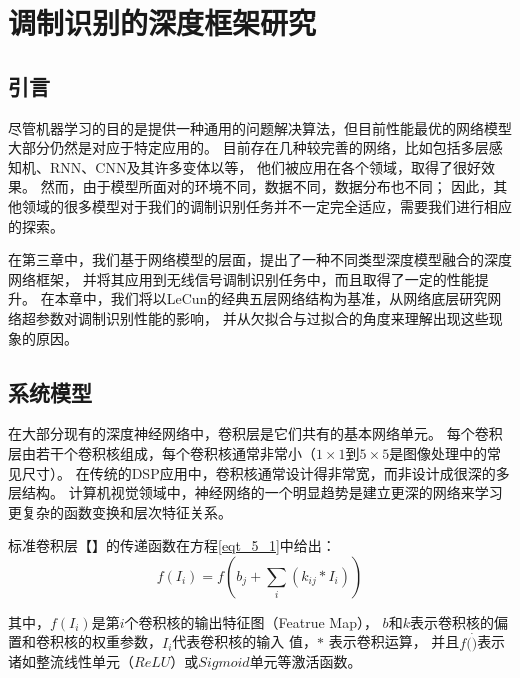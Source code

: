 \chapter{调制识别的深度框架研究}

\section{引言}

尽管机器学习的目的是提供一种通用的问题解决算法，但目前性能最优的网络模型大部分仍然是对应于特定应用的。
目前存在几种较完善的网络，比如包括多层感知机、RNN、CNN及其许多变体以等，
他们被应用在各个领域，取得了很好效果。
然而，由于模型所面对的环境不同，数据不同，数据分布也不同；
因此，其他领域的很多模型对于我们的调制识别任务并不一定完全适应，需要我们进行相应的探索。 \par

在第三章中，我们基于网络模型的层面，提出了一种不同类型深度模型融合的深度网络框架，
并将其应用到无线信号调制识别任务中，而且取得了一定的性能提升。
在本章中，我们将以LeCun的经典五层网络结构为基准，从网络底层研究网络超参数对调制识别性能的影响，
并从欠拟合与过拟合的角度来理解出现这些现象的原因。\par

\section{系统模型}

在大部分现有的深度神经网络中，卷积层是它们共有的基本网络单元。
每个卷积层由若干个卷积核组成，每个卷积核通常非常小（$1 \times 1$到$5 \times 5$是图像处理中的常见尺寸）。
在传统的DSP应用中，卷积核通常设计得非常宽，而非设计成很深的多层结构。
计算机视觉领域中，神经网络的一个明显趋势是建立更深的网络来学习更复杂的函数变换和层次特征关系。\par

标准卷积层【】的传递函数在方程\ref{eqt_5_1}中给出：
\begin{equation}
	\label{eqt_5_1}
	f(I_i) = f (b_j + \sum_{i}(k_{ij} * I_i))
\end{equation}

其中，$f(I_i)$是第$i$个卷积核的输出特征图（Featrue Map），
$b$和$k$表示卷积核的偏置和卷积核的权重参数，$I_i$代表卷积核的输入 值，$*$ 表示卷积运算，
并且$f(\dot)$表示诸如整流线性单元（$ReLU$）或$Sigmoid$单元等激活函数。\par

